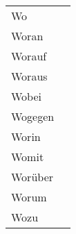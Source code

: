 \documentclass[a4paper,12pt]{article}
\begin{document}
\begin{adjustwidth}{2em}{0pt}
\begin{minipage}{.5\linewidth}
\begin{tabular}{l|l}
\rowcolor{white}     Wo &  \\
\rowcolor{lightgray} Woran &  \\
\rowcolor{white}     Worauf &  \\
\rowcolor{lightgray} Woraus &  \\
\rowcolor{white}     Wobei &  \\
\rowcolor{lightgray} Wogegen &  \\
\rowcolor{white}     Worin &  \\
\rowcolor{lightgray} Womit &  \\
\rowcolor{white}     Worüber &  \\
\rowcolor{lightgray} Worum &  \\
\rowcolor{white}     Wozu &  \\


\bottomrule
\end{tabular}
\vspace{0.3cm}
\newline
\end{minipage}

\end{adjustwidth}

\end{document}
